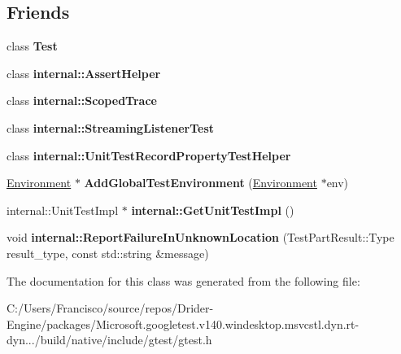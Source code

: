 \subsection*{Friends}
\begin{DoxyCompactItemize}
\item 
\mbox{\label{classtesting_1_1_unit_test_a5b78b1c2e1fa07ffed92da365593eaa4}} 
class {\bfseries Test}
\item 
\mbox{\label{classtesting_1_1_unit_test_a183151aa061362c87572e743fe233db1}} 
class {\bfseries internal\+::\+Assert\+Helper}
\item 
\mbox{\label{classtesting_1_1_unit_test_afa3927576c08d7b1e197ba16b2b3dcb7}} 
class {\bfseries internal\+::\+Scoped\+Trace}
\item 
\mbox{\label{classtesting_1_1_unit_test_adc037d188dab349a94868991955c9cd4}} 
class {\bfseries internal\+::\+Streaming\+Listener\+Test}
\item 
\mbox{\label{classtesting_1_1_unit_test_ae970f89a9f477a349fe5778be85ef42e}} 
class {\bfseries internal\+::\+Unit\+Test\+Record\+Property\+Test\+Helper}
\item 
\mbox{\label{classtesting_1_1_unit_test_a5ec26e4c31220ff8e769cc09689a4d6d}} 
\hyperlink{classtesting_1_1_environment}{Environment} $\ast$ {\bfseries Add\+Global\+Test\+Environment} (\hyperlink{classtesting_1_1_environment}{Environment} $\ast$env)
\item 
\mbox{\label{classtesting_1_1_unit_test_a56e56be7066957d612e53b5c60f6ac08}} 
internal\+::\+Unit\+Test\+Impl $\ast$ {\bfseries internal\+::\+Get\+Unit\+Test\+Impl} ()
\item 
\mbox{\label{classtesting_1_1_unit_test_a73f5a158c13793b90c80d854c9a75120}} 
void {\bfseries internal\+::\+Report\+Failure\+In\+Unknown\+Location} (Test\+Part\+Result\+::\+Type result\+\_\+type, const std\+::string \&message)
\end{DoxyCompactItemize}


The documentation for this class was generated from the following file\+:\begin{DoxyCompactItemize}
\item 
C\+:/\+Users/\+Francisco/source/repos/\+Drider-\/\+Engine/packages/\+Microsoft.\+googletest.\+v140.\+windesktop.\+msvcstl.\+dyn.\+rt-\/dyn.../build/native/include/gtest/gtest.\+h\end{DoxyCompactItemize}
